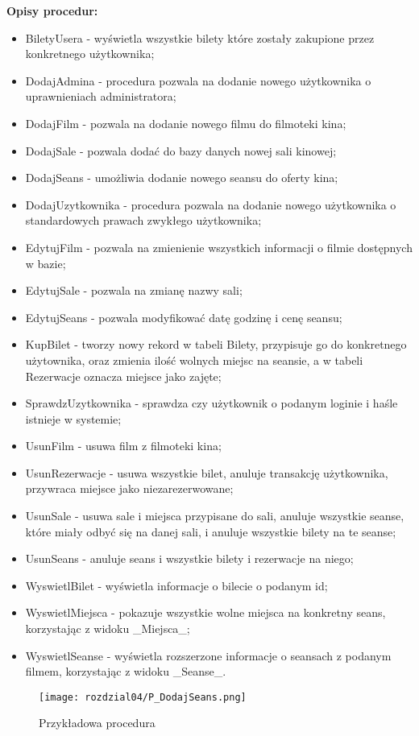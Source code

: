 \textbf{Opisy procedur:}
\begin{itemize}
	\item BiletyUsera - wyświetla wszystkie bilety które zostały zakupione przez konkretnego użytkownika;
	\item DodajAdmina - procedura pozwala na dodanie nowego użytkownika o uprawnieniach administratora;
	\item DodajFilm - pozwala na dodanie nowego filmu do filmoteki kina;
	\item DodajSale - pozwala dodać do bazy danych nowej sali kinowej;
	\item DodajSeans - umożliwia dodanie nowego seansu do oferty kina;
	\item DodajUzytkownika - procedura pozwala na dodanie nowego użytkownika o standardowych prawach zwykłego użytkownika;
	\item EdytujFilm - pozwala na zmienienie wszystkich informacji o filmie dostępnych w bazie;
	\item EdytujSale - pozwala na zmianę nazwy sali;
	\item EdytujSeans - pozwala modyfikować datę godzinę i cenę seansu;
	\item KupBilet - tworzy nowy rekord w tabeli Bilety, przypisuje go do konkretnego użytownika, oraz zmienia ilość wolnych miejsc na seansie, a w tabeli Rezerwacje oznacza miejsce jako zajęte;
	\item SprawdzUzytkownika - sprawdza czy użytkownik o podanym loginie i haśle istnieje w systemie;
	\item UsunFilm - usuwa film z filmoteki kina;
	\item UsunRezerwacje - usuwa wszystkie bilet, anuluje transakcję użytkownika, przywraca miejsce jako niezarezerwowane;
	\item UsunSale - usuwa sale i miejsca przypisane do sali, anuluje wszystkie seanse, które miały odbyć się na danej sali, i anuluje wszystkie bilety na te seanse;
	\item UsunSeans - anuluje seans i wszystkie bilety i rezerwacje na niego;
	\item WyswietlBilet - wyświetla informacje o bilecie o podanym id;
	\item WyswietlMiejsca - pokazuje wszystkie wolne miejsca na konkretny seans, korzystając z widoku \_Miejsca\_;
	\item WyswietlSeanse - wyświetla rozszerzone informacje o seansach z podanym filmem, korzystając z widoku \_Seanse\_.
\end{itemize}

\begin{figure} [H]
	\centering
	\texttt{[image: rozdzial04/P\_DodajSeans.png]}
	\caption{Przykładowa procedura}
	\label{fig:p_DodajSeans}
\end{figure}